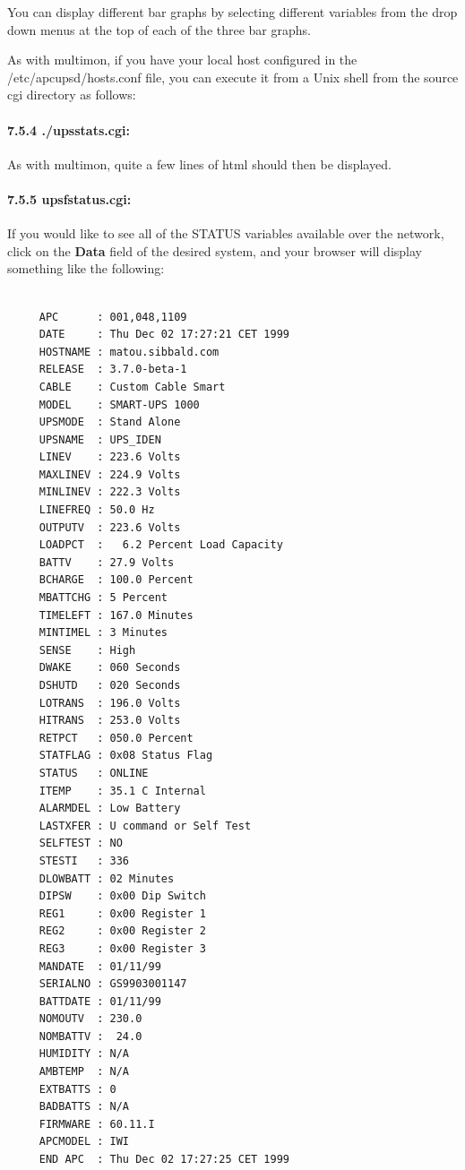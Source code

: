 You can display different bar graphs by selecting different variables from the
drop down menus at the top of each of the three bar graphs.  

As with multimon, if you have your local host configured in the
/etc/apcupsd/hosts.conf file, you can execute it from a Unix shell from the
source cgi directory as follows: 

\label{_005f_002fupsstats_005fcgi}

\paragraph*{7.5.4 ./upsstats.cgi:}

\label{index-upssstats-130}
\label{index-CGI_002c-upssstats-131}
As with multimon, quite a few lines of html should then be displayed. 

\label{upsfstatus_005fcgi}

\paragraph*{7.5.5 upsfstatus.cgi:}

\label{index-upsfstatus-132}
\label{index-CGI_002c-upsfstatus-133}
If you would like to see all of the STATUS variables available over the
network, click on the {\bf Data} field of the desired system, and your browser
will display something like the following: 

\footnotesize
\begin{verbatim}
     
     APC      : 001,048,1109
     DATE     : Thu Dec 02 17:27:21 CET 1999
     HOSTNAME : matou.sibbald.com
     RELEASE  : 3.7.0-beta-1
     CABLE    : Custom Cable Smart
     MODEL    : SMART-UPS 1000
     UPSMODE  : Stand Alone
     UPSNAME  : UPS_IDEN
     LINEV    : 223.6 Volts
     MAXLINEV : 224.9 Volts
     MINLINEV : 222.3 Volts
     LINEFREQ : 50.0 Hz
     OUTPUTV  : 223.6 Volts
     LOADPCT  :   6.2 Percent Load Capacity
     BATTV    : 27.9 Volts
     BCHARGE  : 100.0 Percent
     MBATTCHG : 5 Percent
     TIMELEFT : 167.0 Minutes
     MINTIMEL : 3 Minutes
     SENSE    : High
     DWAKE    : 060 Seconds
     DSHUTD   : 020 Seconds
     LOTRANS  : 196.0 Volts
     HITRANS  : 253.0 Volts
     RETPCT   : 050.0 Percent
     STATFLAG : 0x08 Status Flag
     STATUS   : ONLINE
     ITEMP    : 35.1 C Internal
     ALARMDEL : Low Battery
     LASTXFER : U command or Self Test
     SELFTEST : NO
     STESTI   : 336
     DLOWBATT : 02 Minutes
     DIPSW    : 0x00 Dip Switch
     REG1     : 0x00 Register 1
     REG2     : 0x00 Register 2
     REG3     : 0x00 Register 3
     MANDATE  : 01/11/99
     SERIALNO : GS9903001147
     BATTDATE : 01/11/99
     NOMOUTV  : 230.0
     NOMBATTV :  24.0
     HUMIDITY : N/A
     AMBTEMP  : N/A
     EXTBATTS : 0
     BADBATTS : N/A
     FIRMWARE : 60.11.I
     APCMODEL : IWI
     END APC  : Thu Dec 02 17:27:25 CET 1999
\end{verbatim}
\normalsize

